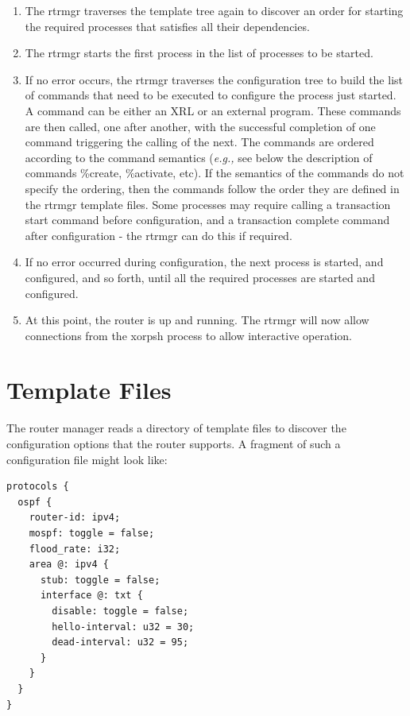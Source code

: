\documentclass[11pt]{article}
\newcommand{\eg}{\emph{e.g.,}\xspace}
\begin{document}
\begin{enumerate}
  \item The rtrmgr traverses the template tree again to discover an order for
starting the required processes that satisfies all their dependencies.

  \item The rtrmgr starts the first process in the list of processes to be
started.

  \item If no error occurs, the rtrmgr traverses the configuration tree to
build the list of commands that need to be executed to configure the process
just started.  A command can be either an XRL or an external program.
These commands are then called, one after another, with the
successful completion of one command triggering the calling of the next.
The commands are ordered according to the command semantics
(\eg see below the description of commands
\%create, \%activate, etc). If the semantics of the commands
do not specify the ordering, then the commands follow the order they
are defined in the rtrmgr template files.
Some processes may require calling a transaction start command before
configuration, and a transaction complete command after configuration -
the rtrmgr can do this if required.

  \item If no error occurred during configuration, the next process is started,
and configured, and so forth, until all the required processes are
started and configured.

  \item At this point, the router is up and running.  The rtrmgr will now
allow connections from the xorpsh process to allow interactive
operation.

\end{enumerate}

\newpage

\section{Template Files}

The router manager reads a directory of template files to discover the
configuration options that the router supports.  A fragment of such a
configuration file might look like:

\begin{verbatim}
protocols {
  ospf {
    router-id: ipv4;
    mospf: toggle = false;
    flood_rate: i32;
    area @: ipv4 {
      stub: toggle = false;
      interface @: txt {
        disable: toggle = false;
        hello-interval: u32 = 30;
        dead-interval: u32 = 95;
      }
    }
  }
}
\end{verbatim}
\end{document}
